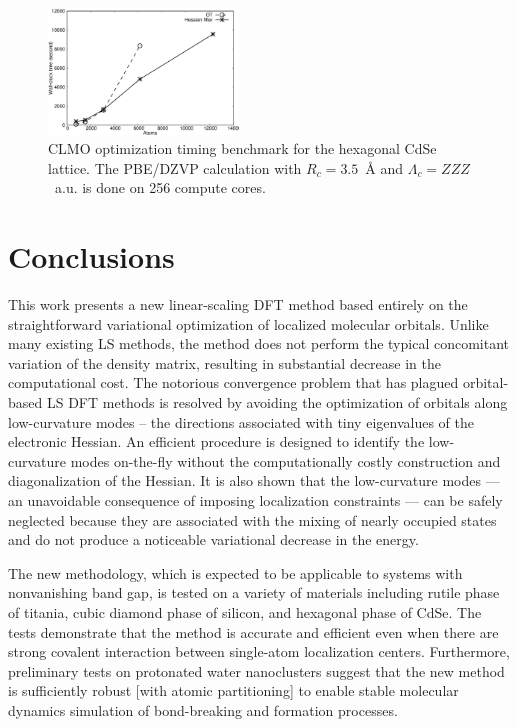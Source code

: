 \documentclass[aps,prl,twocolumn,reprint,amsmath,amssymb]{revtex4-1}
\begin{document}
\begin{figure}
\centering
\includegraphics[width=0.45\textwidth]{timing}
\caption{CLMO optimization timing benchmark for the hexagonal CdSe lattice. The PBE/DZVP calculation with $R_c=3.5$~{\AA} and $\Lambda_c = ZZZ$~a.u. is done on 256 compute cores.}
\label{fig:scaling}
\end{figure}


\section{Conclusions} 

This work presents a new linear-scaling DFT method based entirely on the straightforward variational optimization of localized molecular orbitals. 
Unlike many existing LS methods, the method does not perform the typical concomitant variation of the density matrix, resulting in substantial decrease in the computational cost. 
The notorious convergence problem that has plagued orbital-based LS DFT methods is resolved by avoiding the optimization of orbitals along low-curvature modes -- the directions associated with tiny eigenvalues of the electronic Hessian. 
An efficient procedure is designed to identify the low-curvature modes on-the-fly without the computationally costly construction and diagonalization of the Hessian. 
It is also shown that the low-curvature modes --- an unavoidable consequence of imposing localization constraints --- can be safely neglected because they are associated with the mixing of nearly occupied states and do not produce a noticeable variational decrease in the energy. 

The new methodology, which is expected to be applicable to systems with nonvanishing band gap, is tested on a variety of materials including rutile phase of titania, cubic diamond phase of silicon, and hexagonal phase of CdSe. The tests demonstrate that the method is accurate and efficient even when there are strong covalent interaction between single-atom localization centers. 
%
Furthermore, preliminary tests on protonated water nanoclusters suggest that the new method is sufficiently robust [with atomic partitioning] to enable stable molecular dynamics simulation of bond-breaking and formation processes. 
\end{document}
